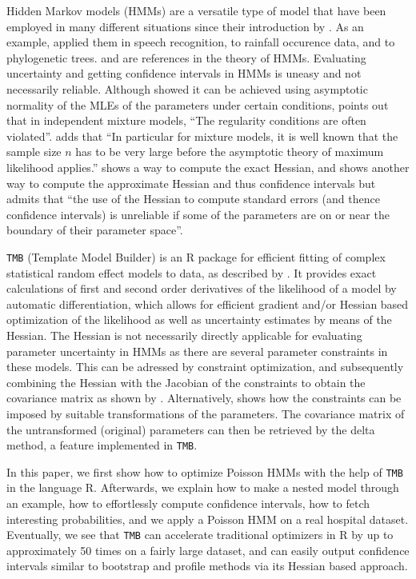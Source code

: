 \documentclass[bimj,fleqn]{w-art}\usepackage[]{graphicx}\usepackage[]{color}
\theoremstyle{plain}
\theoremstyle{definition}
\begin{document}
Hidden Markov models (HMMs) are a versatile type of model that have been employed in many different situations since their introduction by \citet{baum}.
As an example, \citet{fredkin} applied them in speech recognition, \citet{lystig} to rainfall occurence data, and \citet{schadt} to phylogenetic trees.
\citet{fredkin} and \citet{zucchini} are references in the theory of HMMs.
Evaluating uncertainty and getting confidence intervals in HMMs is uneasy and not necessarily reliable.
Although \citet[][Chapter 12]{cappe} showed it can be achieved using asymptotic normality of the MLEs of the parameters under certain conditions, \citet[p. ~53]{fruhwirth-schnatter} points out that in independent mixture models, ``The regularity conditions are often violated''.
\citet[p. ~68]{mclachlan} adds that ``In particular for mixture models, it is well known that the sample size $n$ has to be very large before the asymptotic theory of maximum likelihood applies.''
\citet{lystig} shows a way to compute the exact Hessian, and \citet{zucchini} shows another way to compute the approximate Hessian and thus confidence intervals but admits that ``the use of the Hessian to compute standard errors (and thence confidence intervals) is unreliable if some of the parameters are on or near the boundary of their parameter space''.

{\tt{TMB}} (Template Model Builder) is an R package for efficient fitting of complex statistical random effect models to data, as described by \citet{kristensen}.
It provides exact calculations of first and second order derivatives of the likelihood of a model by automatic differentiation, which allows for efficient gradient and/or Hessian based optimization of the likelihood as well as uncertainty estimates by means of the Hessian.
The Hessian is not necessarily directly applicable for evaluating parameter uncertainty in HMMs as there are several parameter constraints in these models.
This can be adressed by constraint optimization, and subsequently combining the Hessian with the Jacobian of the constraints to obtain the covariance matrix as shown by \citet{visser}.
Alternatively, \citet{zucchini} shows how the constraints can be imposed by suitable transformations of the parameters.
The covariance matrix of the untransformed (original) parameters can then be retrieved by the delta method, a feature implemented in {\tt{TMB}}.

In this paper, we first show how to optimize Poisson HMMs with the help of {\tt{TMB}} in the language R.
Afterwards, we explain how to make a nested model through an example, how to effortlessly compute confidence intervals, how to fetch interesting probabilities, and we apply a Poisson HMM on a real hospital dataset.
Eventually, we see that {\tt{TMB}} can accelerate traditional optimizers in R by up to approximately 50 times on a fairly large dataset, and can easily output confidence intervals similar to bootstrap and profile methods via its Hessian based approach.
\end{document}
